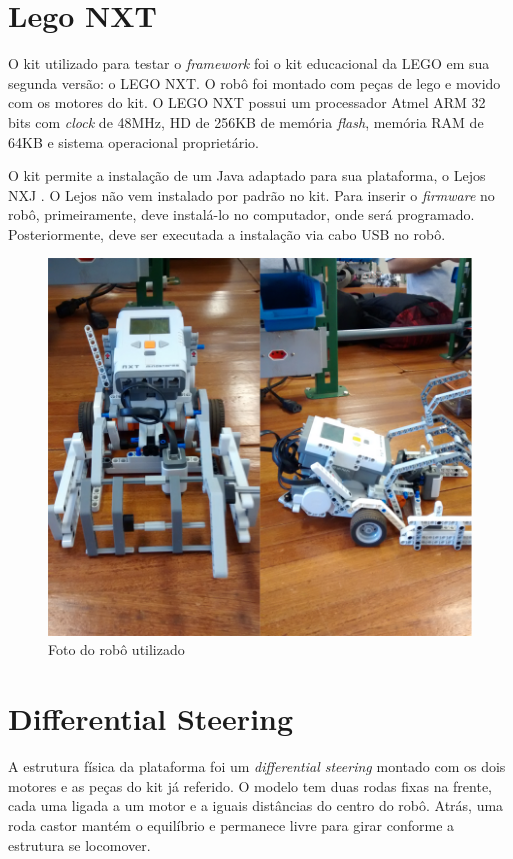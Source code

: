 \section{Lego NXT}

O kit utilizado para testar o \textit{framework} foi o kit educacional da LEGO em sua segunda versão: o LEGO NXT. O robô foi montado com peças de lego e movido com os motores do kit. O LEGO NXT possui um processador Atmel ARM 32 bits com \textit{clock} de 48MHz, HD de 256KB de memória \textit{flash}, memória RAM de 64KB e sistema operacional proprietário.

O kit permite a instalação de um Java adaptado para sua plataforma, o Lejos NXJ \cite{LEJOS_SITE}. O Lejos não vem instalado por padrão no kit. Para inserir o \textit{firmware} no robô, primeiramente, deve instalá-lo no computador, onde será programado. Posteriormente, deve ser executada a instalação via cabo USB no robô.

\begin{figure}[h]
	\centering
	\label{fig17}
		\includegraphics[keepaspectratio=true,scale=0.2]{figuras/5nxtBrick.png}
	\caption{Foto do robô utilizado}
\end{figure}

\section{Differential Steering}

A estrutura física da plataforma foi um \textit{differential steering} montado com os dois motores e as peças do kit já referido. O modelo tem duas rodas fixas na frente, cada uma ligada a um motor e a iguais distâncias do centro do robô. Atrás, uma roda castor mantém o equilíbrio e permanece livre para girar conforme a estrutura se locomover.

